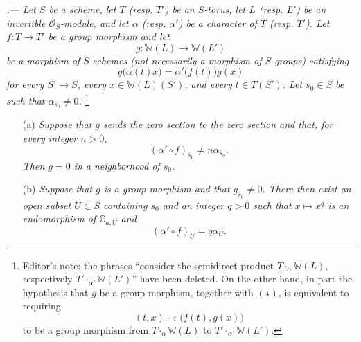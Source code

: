 \par\medskip\noindent
\textbf{\textit{.}}---
\textit{Let \(S\) be a scheme, let \(T\) \textup{(resp. \(T'\))} be
an \(S\)-torus, let \(L\) \textup{(resp. \(L'\))} be an invertible
\(\mathcal O_S\)-module, and let \(\alpha\)
\textup{(resp. \(\alpha'\))} be a character of \(T\)
\textup{(resp. \(T'\))}.  Let \(f\colon T\to T'\) be a group
morphism and let
\[
  g\colon\mathbb W(L)\longrightarrow\mathbb W(L')
\]
be a morphism of \(S\)-schemes \textup{(not necessarily a morphism
of \(S\)-groups)} satisfying}
\[
  \tag{\(\star\)}\label{sga3:xix:paragraph:4-11:equation:star}
  g\bigl(\alpha(t)x\bigr)
  =
  \alpha'\bigl(f(t)\bigr)g(x)
\]
\textit{for every \(S'\to S\), every \(x\in\mathbb W(L)(S')\), and
every \(t\in T(S')\).  Let \(s_0\in S\) be such that
\(\alpha_{\bar s_0}\ne0\).}
\footnote{Editor's note: the phrases ``consider the semidirect
product \(T\mathbin{\cdot_\alpha}\mathbb W(L)\), respectively
\(T'\mathbin{\cdot_{\alpha'}}\mathbb W(L')\)'' have been deleted.
On the other hand, in part \textup{} the hypothesis that \(g\) be
a group morphism, together with \textup{\((\star)\)}, is equivalent
to requiring
\[
  (t,x)\longmapsto\bigl(f(t),g(x)\bigr)
\]
to be a group morphism from
\(T\mathbin{\cdot_\alpha}\mathbb W(L)\) to
\(T'\mathbin{\cdot_{\alpha'}}\mathbb W(L')\).}

\begin{enumerate}
\item[\textup{(a)}]
\textit{Suppose that \(g\) sends the zero section to the zero section
and that, for every integer \(n>0\),}
\[
  (\alpha'\circ f)_{\bar s_0}\ne n\alpha_{\bar s_0}.
\]
\textit{Then \(g=0\) in a neighborhood of \(s_0\).}

\item[\textup{\SGAInlineRefTarget{sga3:xix:proposition:4-12:item:b}\SGAInlineRefTarget{sga3:xix:paragraph:4:11:item:b}(b)}]
\textit{Suppose that \(g\) is a group morphism and that
\(g_{\bar s_0}\ne0\).  There then exist an open subset \(U\subset S\)
containing \(s_0\) and an integer \(q>0\) such that
\(x\longmapsto x^q\) is an endomorphism of
\(\mathbb G_{a,U}\) and}
\[
  (\alpha'\circ f)_U=q\alpha_U.
\]
\end{enumerate}



